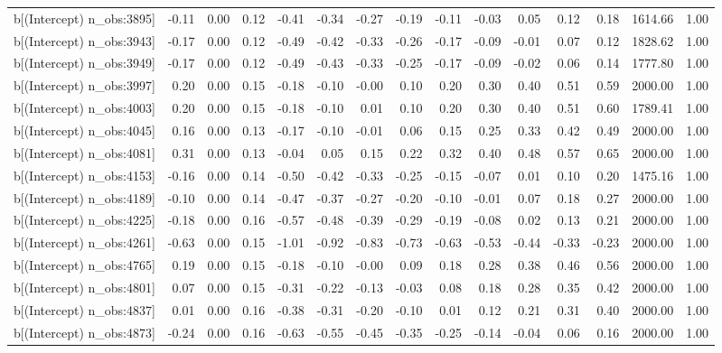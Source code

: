 \begin{table}[ht]
\begin{tabular}{rrrrrrrrrrrrrrr}
  b[(Intercept) n\_obs:3895] & -0.11 & 0.00 & 0.12 & -0.41 & -0.34 & -0.27 & -0.19 & -0.11 & -0.03 & 0.05 & 0.12 & 0.18 & 1614.66 & 1.00 \\ 
  b[(Intercept) n\_obs:3943] & -0.17 & 0.00 & 0.12 & -0.49 & -0.42 & -0.33 & -0.26 & -0.17 & -0.09 & -0.01 & 0.07 & 0.12 & 1828.62 & 1.00 \\ 
  b[(Intercept) n\_obs:3949] & -0.17 & 0.00 & 0.12 & -0.49 & -0.43 & -0.33 & -0.25 & -0.17 & -0.09 & -0.02 & 0.06 & 0.14 & 1777.80 & 1.00 \\ 
  b[(Intercept) n\_obs:3997] & 0.20 & 0.00 & 0.15 & -0.18 & -0.10 & -0.00 & 0.10 & 0.20 & 0.30 & 0.40 & 0.51 & 0.59 & 2000.00 & 1.00 \\ 
  b[(Intercept) n\_obs:4003] & 0.20 & 0.00 & 0.15 & -0.18 & -0.10 & 0.01 & 0.10 & 0.20 & 0.30 & 0.40 & 0.51 & 0.60 & 1789.41 & 1.00 \\ 
  b[(Intercept) n\_obs:4045] & 0.16 & 0.00 & 0.13 & -0.17 & -0.10 & -0.01 & 0.06 & 0.15 & 0.25 & 0.33 & 0.42 & 0.49 & 2000.00 & 1.00 \\ 
  b[(Intercept) n\_obs:4081] & 0.31 & 0.00 & 0.13 & -0.04 & 0.05 & 0.15 & 0.22 & 0.32 & 0.40 & 0.48 & 0.57 & 0.65 & 2000.00 & 1.00 \\ 
  b[(Intercept) n\_obs:4153] & -0.16 & 0.00 & 0.14 & -0.50 & -0.42 & -0.33 & -0.25 & -0.15 & -0.07 & 0.01 & 0.10 & 0.20 & 1475.16 & 1.00 \\ 
  b[(Intercept) n\_obs:4189] & -0.10 & 0.00 & 0.14 & -0.47 & -0.37 & -0.27 & -0.20 & -0.10 & -0.01 & 0.07 & 0.18 & 0.27 & 2000.00 & 1.00 \\ 
  b[(Intercept) n\_obs:4225] & -0.18 & 0.00 & 0.16 & -0.57 & -0.48 & -0.39 & -0.29 & -0.19 & -0.08 & 0.02 & 0.13 & 0.21 & 2000.00 & 1.00 \\ 
  b[(Intercept) n\_obs:4261] & -0.63 & 0.00 & 0.15 & -1.01 & -0.92 & -0.83 & -0.73 & -0.63 & -0.53 & -0.44 & -0.33 & -0.23 & 2000.00 & 1.00 \\ 
  b[(Intercept) n\_obs:4765] & 0.19 & 0.00 & 0.15 & -0.18 & -0.10 & -0.00 & 0.09 & 0.18 & 0.28 & 0.38 & 0.46 & 0.56 & 2000.00 & 1.00 \\ 
  b[(Intercept) n\_obs:4801] & 0.07 & 0.00 & 0.15 & -0.31 & -0.22 & -0.13 & -0.03 & 0.08 & 0.18 & 0.28 & 0.35 & 0.42 & 2000.00 & 1.00 \\ 
  b[(Intercept) n\_obs:4837] & 0.01 & 0.00 & 0.16 & -0.38 & -0.31 & -0.20 & -0.10 & 0.01 & 0.12 & 0.21 & 0.31 & 0.40 & 2000.00 & 1.00 \\ 
  b[(Intercept) n\_obs:4873] & -0.24 & 0.00 & 0.16 & -0.63 & -0.55 & -0.45 & -0.35 & -0.25 & -0.14 & -0.04 & 0.06 & 0.16 & 2000.00 & 1.00 \\ 

\end{tabular}
\end{table}
